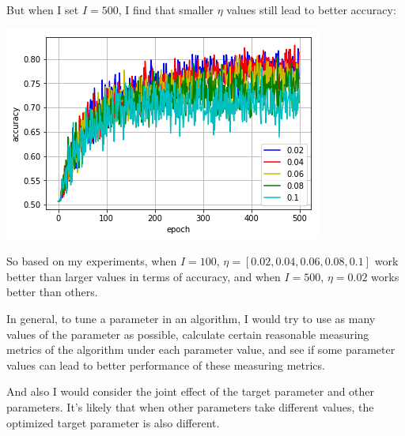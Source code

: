 \documentclass[paper=letter, fontsize=12pt]{article}
\begin{document}
\begin{enumerate}
\begin{enumerate}
	But when I set $I = 500$, I find that smaller $\eta$ values still lead to better accuracy:
	
	\includegraphics[scale=0.5]{p2q2b4.png}
	
	So based on my experiments, when $I = 100$, $\eta = [0.02, 0.04, 0.06, 0.08, 0.1]$ work better than larger values in terms of accuracy, and when $I = 500$, $\eta = 0.02$ works better than others.
	
	In general, to tune a parameter in an algorithm, I would try to use as many values of the parameter as possible, calculate certain reasonable measuring metrics of the algorithm under each parameter value, and see if some parameter values can lead to better performance of these measuring metrics. 
	
	And also I would consider the joint effect of the target parameter and other parameters. It's likely that when other parameters take different values, the optimized target parameter is also different.
\end{enumerate}
\end{enumerate}
\end{document}
